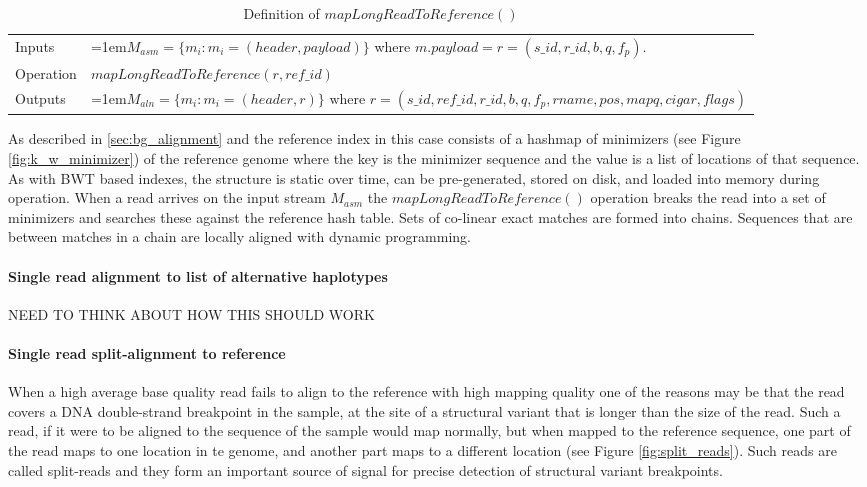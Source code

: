 \bgroup
\def\arraystretch{1.5}
\begin{table}[!ht]
    \caption{Definition of $mapLongReadToReference()$}
    \label{tab:op_map_long_read_to_reference}
    {\begin{tabular}{l|p{12cm}}
    \toprule
    Inputs & \hangindent=1em$M_{asm} = \{m_i: m_i = (header, payload)\}$ where $m.payload = r = (s\_id, r\_id, b, q, f_p)$. \\
    \cline{2-2}
    Operation & $mapLongReadToReference(r, ref\_id)$\\
    \cline{2-2}
    Outputs & \hangindent=1em$M_{aln} = \{m_i: m_i = (header, r)\} \text{ where } r = (s\_id, ref\_id, r\_id, b, q, f_p, rname, pos, mapq, cigar, flags)$\\
    \bottomrule
    \end{tabular}}
\end{table}
\egroup

As described in \ref{sec:bg_alignment} and \autocite{li2018minimap2} the reference index in this case consists of a hashmap of minimizers (see Figure \ref{fig:k_w_minimizer}) of the reference genome where the key is the minimizer sequence and the value is a list of locations of that sequence. As with BWT based indexes, the structure is static over time, can be pre-generated, stored on disk, and loaded into memory during operation. When a read arrives on the input stream $M_{asm}$ the $mapLongReadToReference()$ operation breaks the read into a set of minimizers and searches these against the reference hash table. Sets of co-linear exact matches are formed into chains. Sequences that are between matches in a chain are locally aligned with dynamic programming. 

\paragraph{Single read alignment to list of alternative haplotypes}
NEED TO THINK ABOUT HOW THIS SHOULD WORK

\paragraph{Single read split-alignment to reference}
When a high average base quality read fails to align to the reference with high mapping quality one of the reasons may be that the read covers a DNA double-strand breakpoint in the sample, at the site of a structural variant that is longer than the size of the read. Such a read, if it were to be aligned to the sequence of the sample would map normally, but when mapped to the reference sequence, one part of the read maps to one location in te genome, and another part maps to a different location (see Figure \ref{fig:split_reads}). Such reads are called split-reads and they form an important source of signal for precise detection of structural variant breakpoints\autocites{rausch2012delly}{layer2014lumpy}.

